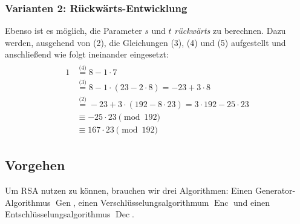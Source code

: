 \begin{beispiel}[EEA]
    \subsubsection*{Varianten 2: Rückwärts-Entwicklung}
    Ebenso ist es möglich, die Parameter $s$ und $t$ \emph{rückwärts} zu berechnen. Dazu werden, ausgehend von (2), 
    die Gleichungen (3), (4) und (5) aufgestellt und anschließend wie folgt ineinander eingesetzt:  
    \begin{align*}
      \begin{split}
        1	&\stackrel{\textit{(4)}}{=} 8 - 1 \cdot 7\\
        &\stackrel{\textit{(3)}}{=} 8 - 1 \cdot (23 - 2 \cdot 8) = -23 + 3 \cdot 8\\
        &\stackrel{\textit{(2)}}{=} -23 + 3 \cdot (192 - 8 \cdot 23) = 3 \cdot 192 - 25 \cdot 23\\[.5cm]
        &\equiv -25 \cdot 23 \pmod{192}\\
        &\equiv 167 \cdot 23 \pmod{192}
      \end{split}
    \end{align*}
  \end{beispiel}
  

\subsection{Vorgehen}
\label{ch:asymmenc:rsa:vorgehen}
Um RSA \indexRSATextBook nutzen zu können, brauchen wir drei Algorithmen: Einen
Generator-Algorithmus $\operatorname{Gen}$, einen
Verschlüsselungsalgorithmum $\operatorname{Enc}$ und einen
Entschlüsselungsalgorithmus $\operatorname{Dec}$.
